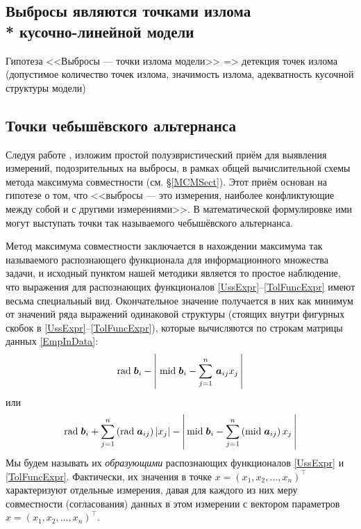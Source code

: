 \documentclass[a5paper,openany]{book}
\newcommand{\mbf}[1]{\protect\text{\boldmath$#1$}}
\newcommand{\m}{\mathrm{mid}\;}
\renewcommand{\r}{\mathrm{rad}\;}
\begin{document}
\subsection[Выбросы являются точками излома модели]%
           {Выбросы являются точками излома \\*  кусочно-линейной модели}

Гипотеза <<Выбросы --- точки излома модели>> => детекция точек излома (допустимое 
количество точек излома, значимость излома, адекватность кусочной структуры модели)  
  
  
  
\subsection{Точки чебышёвского альтернанса} 
  
      
Следуя работе \cite{SShary2018}, изложим простой полуэвристический приём для выявления 
измерений, подозрительных на выбросы, в рамках общей вычислительной схемы метода 
максимума совместности (см. \S\ref{MCMSect}). Этот приём основан на гипотезе о том, 
что <<выбросы --- это измерения, наиболее конфликтующие между собой и с другими 
измерениями>>. В математической формулировке ими могут выступать точки так называемого 
чебышёвского альтернанса. 
  
Метод максимума совместности заключается в нахождении максимума так называемого 
распознающего функционала для информационного множества задачи, и исходный пунктом 
нашей методики является то простое наблюдение, что выражения для распознающих 
функционалов \eqref{UssExpr}--\eqref{TolFuncExpr} имеют весьма специальный вид. 
Окончательное значение получается в них как минимум от значений ряда выражений 
одинаковой структуры (стоящих внутри фигурных скобок 
в \eqref{UssExpr}--\eqref{TolFuncExpr}), которые вычисляются по строкам 
матрицы данных \eqref{EmpInData}: 
\begin{equation*}
\r\mbf{b}_i - \left|\; \m\mbf{b}_i - \sum_{j=1}^n \,\mbf{a}_{ij} x_{j} \,\right| 
\end{equation*}    
или 
\begin{equation*} 
\r\mbf{b}_i + \sum_{j=1}^n \,(\r\mbf{a}_{ij})\,|x_{j}| - 
  \left|\,\m\mbf{b}_i - \sum_{j=1}^n \,(\m\mbf{a}_{ij})\, x_j \,\right|
\end{equation*}
Мы будем называть их \emph{образующими} распознающих функционалов \eqref{UssExpr} и 
\eqref{TolFuncExpr}. Фактически, их значения в точке $x = (x_{1}, x_{2}, \ldots, 
x_{n})^\top$ характеризуют отдельные измерения, давая для каждого из них меру 
совместности (согласования) данных в этом  измерении с вектором параметров 
$x = (x_{1}, x_{2}, \ldots, x_{n})^\top$. 
  
\end{document}
